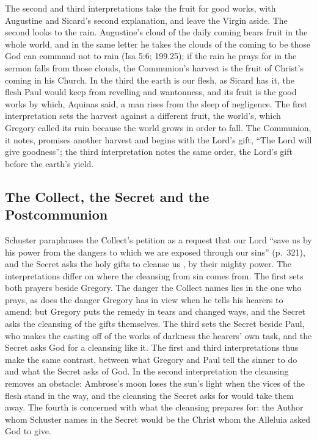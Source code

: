 The second and third interpretations take the fruit for good works, with
Augustine and Sicard's second explanation, and leave the Virgin aside. The second looks to the rain. Augustine's cloud of the
daily coming bears fruit in the whole world, and in the same letter he takes the clouds of
the coming to be those God can command not to rain (Isa 5:6; 199.25); if the
rain he prays for in the sermon falls from those clouds, the Communion's
harvest is the fruit of Christ's coming in his Church. In the third the
earth is our flesh, as Sicard has it, the flesh Paul would keep from
revelling and wantonness, and its fruit is the good works by which, Aquinas
said, a man rises from the sleep of negligence. The first interpretation
sets the harvest against a different fruit, the world's, which Gregory called
its ruin because the world grows in order to fall. The Communion, it notes,
promises another harvest and begins with the Lord's gift, ``The Lord will
give goodness''; the third interpretation notes the same order, the Lord's
gift before the earth's yield.

\subsection{The Collect, the Secret and the Postcommunion}

Schuster paraphrases the Collect's petition as a request that our Lord ``save
us by his power from the dangers to which we are exposed through our sins''
(p.~321), and the Secret asks the holy gifts to cleanse us , by their mighty power. The interpretations differ on where the
cleansing from sin comes from. The first sets both prayers beside Gregory.
The danger the Collect names lies in the one who prays, as does the danger
Gregory has in view when he tells his hearers to amend; but Gregory puts the
remedy in tears and changed ways, and the Secret asks the cleansing of the
gifts themselves. The third sets the Secret beside Paul, who makes the
casting off of the works of darkness the hearers' own task, and the Secret
asks God for a cleansing like it. The first and third interpretations thus
make the same contrast, between what Gregory and Paul tell the sinner to do
and what the Secret asks of God. In the second interpretation the cleansing
removes an obstacle: Ambrose's moon loses the sun's light when the vices of
the flesh stand in the way, and the cleansing the Secret asks for would take
them away. The fourth is concerned with what the cleansing prepares
for: the
Author whom Schuster names in the Secret would be the Christ whom the
Alleluia asked God to give.

